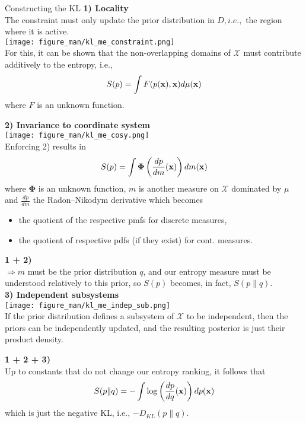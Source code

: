 \documentclass[11pt,compress,t,notes=noshow, xcolor=table]{beamer}
\begin{document}
\begin{vbframe}{Constructing the KL}
    \textbf{1) Locality} \\
    The constraint must only update the prior distribution in $D, i.e.,$ the region where it is active. \\
\texttt{[image: figure\_man/kl\_me\_constraint.png]} \\
    \lz
    For this, it can be shown that the non-overlapping domains of $\mathcal{X}$ must contribute additively to the entropy, i.e.,
    $$S(p) = \int F(p(\mathbf{x}), \mathbf{x}) d\mu(\mathbf{x})$$
    where $F$ is an unknown function.
    
    \framebreak
    
    \textbf{2) Invariance to coordinate system} \\
    \lz 
    \texttt{[image: figure\_man/kl\_me\_cosy.png]} \\
    Enforcing 2) results in 
    $$S(p) = \int \bm{\Phi}\left(\frac{dp}{dm}(\mathbf{x})\right)dm(\mathbf{x})$$
    where $\bm{\Phi}$ is an unknown function, $m$ is another measure on $\mathcal{X}$ dominated by $\mu$ and $\frac{dp}{dm}$ the Radon–Nikodym derivative which becomes 
    \begin{itemize}
        \item the quotient of the respective pmfs for discrete measures,
        \item the quotient of respective pdfs (if they exist) for cont. measures.
    \end{itemize} 

    \framebreak

    \textbf{1 + 2)} 
    \\ $\Rightarrow m$ must be the prior distribution $q$, and our entropy measure must be understood relatively to this prior, so $S(p)$ becomes, in fact, $S(p\|q).$\\
    \lz 
    \textbf{3) Independent subsystems} \\
    \texttt{[image: figure\_man/kl\_me\_indep\_sub.png]} \\
    If the prior distribution defines a subsystem of $\mathcal{X}$ to be independent, then the priors can be independently updated, and the resulting posterior is just their product density.
    
    \framebreak

    \textbf{1 + 2 + 3)} \\
    Up to constants that do not change our entropy ranking, it follows that 
    $$S(p\|q) = - \int \log\left(\frac{dp}{dq}(\mathbf{x})\right)dp(\mathbf{x})$$
    which is just the negative KL, i.e., $-D_{KL}(p\|q).$


\end{vbframe}
\end{document}
